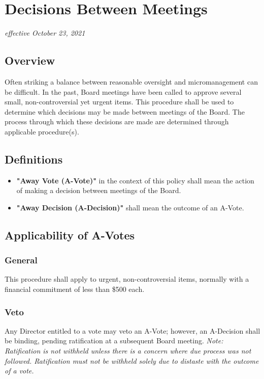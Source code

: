 \section{Decisions Between Meetings}
\textit{effective October 23, 2021}

\subsection{Overview}
Often striking a balance between reasonable oversight and micromanagement can be difficult. In the past, Board meetings have been called to approve several small, non-controversial yet urgent items. This procedure shall be used to determine which decisions may be made between meetings of the Board. The process through which these decisions are made are determined through applicable procedure(s).

\subsection{Definitions}
\begin{itemize}
    \item \textbf{"Away Vote (A-Vote)"} in the context of this policy shall mean the action of making a decision between meetings of the Board. 
    \item \textbf{"Away Decision (A-Decision)"} shall mean the outcome of an A-Vote.
\end{itemize}

\subsection{Applicability of A-Votes}

\subsubsection{General}
This procedure shall apply to urgent, non-controversial items, normally with a financial commitment of less than \$500 each.

\subsubsection{Veto}
Any Director entitled to a vote may veto an A-Vote; however, an A-Decision shall be binding, pending ratification at a subsequent Board meeting.
\textit{Note: Ratification is not withheld unless there is a concern where due process was not followed. Ratification must not be withheld solely due to distaste with the outcome of a vote.}

